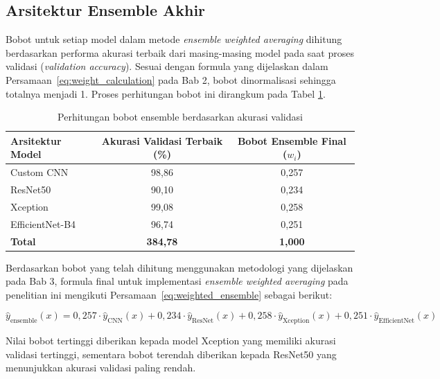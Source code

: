 \subsection{Arsitektur Ensemble Akhir}

Bobot untuk setiap model dalam metode \textit{ensemble weighted averaging} dihitung berdasarkan performa akurasi terbaik dari masing-masing model pada saat proses validasi (\textit{validation accuracy}). Sesuai dengan formula yang dijelaskan dalam Persamaan~\ref{eq:weight_calculation} pada Bab 2, bobot dinormalisasi sehingga totalnya menjadi 1. Proses perhitungan bobot ini dirangkum pada Tabel \ref{tab:ensemble_weights}.

\begin{table}[H]
    \centering
    \caption{Perhitungan bobot ensemble berdasarkan akurasi validasi}
    \label{tab:ensemble_weights}
    \begin{tabular}{|l|c|c|}
        \hline
        \textbf{Arsitektur Model} & \textbf{Akurasi Validasi Terbaik (\%)} & \textbf{Bobot Ensemble Final ($w_i$)} \\
        \hline
        Custom CNN & 98{,}86 & 0{,}257 \\
        ResNet50 & 90{,}10 & 0{,}234 \\
        Xception & 99{,}08 & 0{,}258 \\
        EfficientNet-B4 & 96{,}74 & 0{,}251 \\
        \hline
        \textbf{Total} & \textbf{384{,}78} & \textbf{1{,}000} \\
        \hline
    \end{tabular}
\end{table}

Berdasarkan bobot yang telah dihitung menggunakan metodologi yang dijelaskan pada Bab 3, formula final untuk implementasi \textit{ensemble weighted averaging} pada penelitian ini mengikuti Persamaan~\ref{eq:weighted_ensemble} sebagai berikut:

\begin{equation}
\hat{y}_{\text{ensemble}}(x) = 0{,}257 \cdot \hat{y}_{\text{CNN}}(x) + 0{,}234 \cdot \hat{y}_{\text{ResNet}}(x) + 0{,}258 \cdot \hat{y}_{\text{Xception}}(x) + 0{,}251 \cdot \hat{y}_{\text{EfficientNet}}(x)
\label{eq:final_ensemble}
\end{equation}

Nilai bobot tertinggi diberikan kepada model Xception yang memiliki akurasi validasi tertinggi, sementara bobot terendah diberikan kepada ResNet50 yang menunjukkan akurasi validasi paling rendah.


